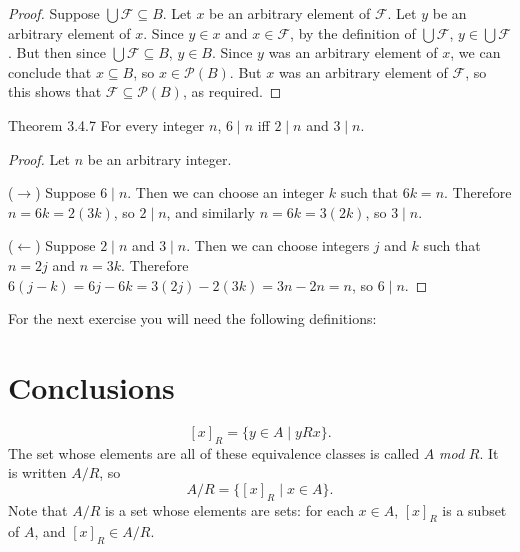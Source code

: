 \documentclass[
  letterpaper,
  DIV=11,
  numbers=noendperiod]{scrreprt}
\newenvironment{mdsk}
	{\medskip}
	{}
\newcommand{\excl}[1]{}
\theoremstyle{remark}
\begin{document}
\begin{proof}

Suppose \(\bigcup \mathcal{F} \subseteq B\). Let \(x\) be an arbitrary
element of \(\mathcal{F}\). Let \(y\) be an arbitrary element of \(x\).
Since \(y \in x\) and \(x \in \mathcal{F}\), by the definition of
\(\bigcup \mathcal{F}\), \(y \in \bigcup \mathcal{F}\). But then since
\(\bigcup \mathcal{F} \subseteq B\), \(y \in B\). Since \(y\) was an
arbitrary element of \(x\), we can conclude that \(x \subseteq B\), so
\(x \in \mathscr{P}(B)\). But \(x\) was an arbitrary element of
\(\mathcal{F}\), so this shows that
\(\mathcal{F} \subseteq \mathscr{P}(B)\), as required. \excl{~□}\qedhere

\end{proof}

\begin{nthm}{Theorem 3.4.7}
For every integer \(n\), \(6 \mid n\) iff \(2 \mid n\) and \(3 \mid n\).

\end{nthm}

\begin{proof}

Let \(n\) be an arbitrary integer.

(\(\to\)) Suppose \(6 \mid n\). Then we can choose an integer \(k\) such
that \(6k=n\). Therefore \(n = 6k = 2(3k)\), so \(2 \mid n\), and
similarly \(n = 6k = 3(2k)\), so \(3 \mid n\).

(\(\leftarrow\)) Suppose \(2 \mid n\) and \(3 \mid n\). Then we can
choose integers \(j\) and \(k\) such that \(n = 2j\) and \(n = 3k\).
Therefore \(6(j-k) = 6j - 6k = 3(2j) - 2(3k) = 3n - 2n = n\), so
\(6 \mid n\). \excl{~□}\qedhere

\end{proof}

\begin{mdsk}

\end{mdsk}

For the next exercise you will need the following definitions:


\hypertarget{conclusions}{%
\chapter{Conclusions}\label{conclusions}}

\[
[x]_R = \{y \in A \mid yRx\}.
\] The set whose elements are all of these equivalence classes is called
\(A\) \emph{mod} \(R\). It is written \(A/R\), so \[
A/R = \{[x]_R \mid x \in A\}.
\] Note that \(A/R\) is a set whose elements are sets: for each
\(x \in A\), \([x]_R\) is a subset of \(A\), and \([x]_R \in A/R\).
\end{document}
